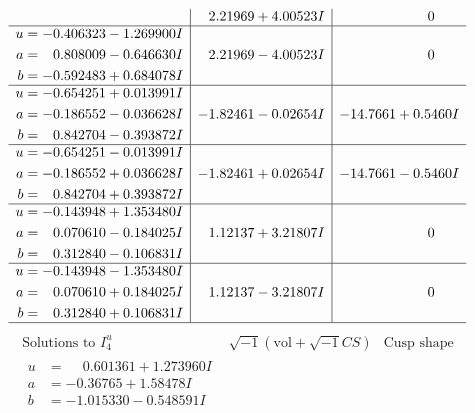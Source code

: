 \documentclass[1p]{elsarticle_modified}
\theoremstyle{definition}
\newcommand{\I}{\sqrt{-1}}
\begin{document}
$$\begin{array}{c|c|c}
 & \phantom{-}2.21969 + 4.00523 I & \phantom{-0.000000 } 0 \\ \hline\begin{aligned}
u &= -0.406323 - 1.269900 I \\
a &= \phantom{-}0.808009 - 0.646630 I \\
b &= -0.592483 + 0.684078 I\end{aligned}
 & \phantom{-}2.21969 - 4.00523 I & \phantom{-0.000000 } 0 \\ \hline\begin{aligned}
u &= -0.654251 + 0.013991 I \\
a &= -0.186552 - 0.036628 I \\
b &= \phantom{-}0.842704 - 0.393872 I\end{aligned}
 & -1.82461 - 0.02654 I & -14.7661 + 0.5460 I \\ \hline\begin{aligned}
u &= -0.654251 - 0.013991 I \\
a &= -0.186552 + 0.036628 I \\
b &= \phantom{-}0.842704 + 0.393872 I\end{aligned}
 & -1.82461 + 0.02654 I & -14.7661 - 0.5460 I \\ \hline\begin{aligned}
u &= -0.143948 + 1.353480 I \\
a &= \phantom{-}0.070610 - 0.184025 I \\
b &= \phantom{-}0.312840 - 0.106831 I\end{aligned}
 & \phantom{-}1.12137 + 3.21807 I & \phantom{-0.000000 } 0 \\ \hline\begin{aligned}
u &= -0.143948 - 1.353480 I \\
a &= \phantom{-}0.070610 + 0.184025 I \\
b &= \phantom{-}0.312840 + 0.106831 I\end{aligned}
 & \phantom{-}1.12137 - 3.21807 I & \phantom{-0.000000 } 0\\
 \hline 
 \end{array}$$\newpage$$\begin{array}{c|c|c}  
\text{Solutions to }I^u_{4}& \I (\text{vol} + \sqrt{-1}CS) & \text{Cusp shape}\\
 \hline 
\begin{aligned}
u &= \phantom{-}0.601361 + 1.273960 I \\
a &= -0.36765 + 1.58478 I \\
b &= -1.015330 - 0.548591 I\end{aligned}

\end{array}$$
\end{document}
